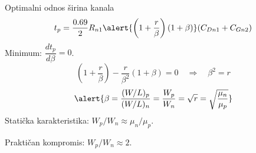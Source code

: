 \begin{frame}[label=09_3-s012]{Optimalni odnos širina kanala}
\[t_p=\frac{0.69}2R_{n1}\alert{\left(1+\frac r\beta\right)(1+\beta)}(C_{Dn1}+C_{Gn2})\]
Minimum: $\dfrac{dt_p}{d\beta}=0$.
\[\left(1+\frac r\beta\right)-\frac r{\beta^2}(1+\beta)=0
\quad\Longrightarrow\quad \beta^2=r\]
\[\alert{\beta=\frac{(W/L)_p}{(W/L)_n}=\frac{W_p}{W_n}=\sqrt r=\sqrt{\frac{\mu_n}{\mu_p}}}\]
Statička karakteristika: $W_p/W_n\approx\mu_n/\mu_p$.\par
Praktičan kompromis: $W_p/W_n\approx2$.
\end{frame}
